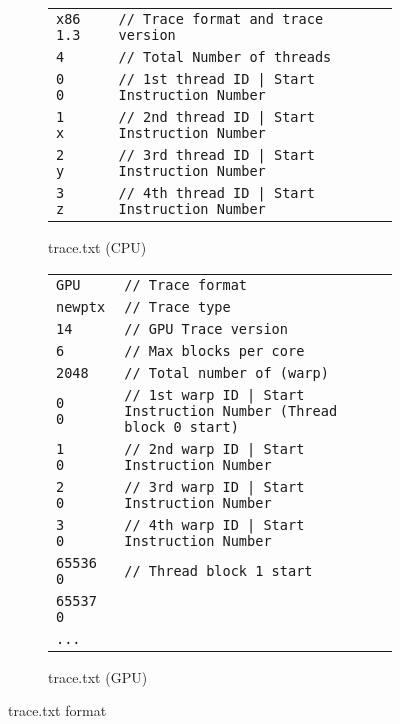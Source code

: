 \begin{figure*}[htb]
    \begin{subfigure}{1\textwidth}
        \centering
        \begin{tabular}{l l}
             \Verb+x86 1.3+ & \Verb+// Trace format and trace version+ \\
             \Verb+4+       & \Verb+// Total Number of threads+ \\
             \Verb+0    0+     & \Verb+// 1st thread ID | Start Instruction Number+ \\
             \Verb+1    x+     & \Verb+// 2nd thread ID | Start Instruction Number+ \\
             \Verb+2    y+     & \Verb+// 3rd thread ID | Start Instruction Number+ \\
             \Verb+3    z+     & \Verb+// 4th thread ID | Start Instruction Number+
        \end{tabular}
        \caption{trace.txt (CPU)}
        \label{fig:trace_format_first}
    \end{subfigure}
    \begin{subfigure}{1\textwidth}
        \centering
        \begin{tabular}{l l}
             \Verb+GPU+      & \Verb+// Trace format+ \\
             \Verb+newptx+   & \Verb+// Trace type+ \\
             \Verb+14+       & \Verb+// GPU Trace version+ \\
             \Verb+6+        & \Verb+// Max blocks per core+ \\
             \Verb+2048+     & \Verb+// Total number of (warp)+ \\
             \Verb+0     0+  & \Verb+// 1st warp ID | Start Instruction Number (Thread block 0 start)+ \\
             \Verb+1     0+  & \Verb+// 2nd warp ID | Start Instruction Number+ \\
             \Verb+2     0+  & \Verb+// 3rd warp ID | Start Instruction Number+ \\
             \Verb+3     0+  & \Verb+// 4th warp ID | Start Instruction Number+ \\
             \Verb+65536 0+  & \Verb+// Thread block 1 start+ \\
             \Verb+65537 0+  & \Verb++ \\
             \Verb+...+      & \Verb++
        \end{tabular}
        \caption{trace.txt (GPU)}
        \label{fig:trace_format_second}
    \end{subfigure}
    \caption{trace.txt format} 
    \label{fig:trace_format}
\end{figure*}

